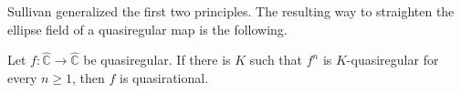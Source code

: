 \documentclass[11pt,a4paper]{article}
\begin{document}
\begin{remark}
Sullivan generalized the first two principles. The resulting way to straighten the ellipse field of a quasiregular map is the following.
\end{remark}
\setcounter{theorem}{50}\begin{theorem}
Let \(f:\widehat{\mathbb C}\to\widehat{\mathbb C}\) be quasiregular. If there is \(K\) such that \(f^n\) is \(K\)-quasiregular for every \(n\ge1\), then \(f\) is quasirational.
\end{theorem}
\end{document}
